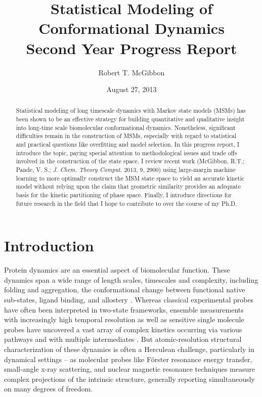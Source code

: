 \documentclass[twocolumn,floatfix,nofootinbib,aps]{revtex4-1}
\begin{document}
\title{Statistical Modeling of Conformational Dynamics \\ {\normalsize Second Year Progress Report}}
\author{Robert T. McGibbon} 
\date{August 27, 2013}

\begin{abstract}
Statistical modeling of long timescale dynamics with Markov state models (MSMs) has been shown to be an effective strategy for building quantitative and qualitative insight into long-time scale biomolecular conformational dynamics. Nonetheless, significant difficulties remain in the construction of MSMs, especially with regard to statistical and practical questions like overfitting and model selection. In this progress report, I introduce the topic, paying special attention to methodological issues and trade offs involved in the construction of the state space. I review recent work (McGibbon, R.T.; Pande, V. S.; \emph{J. Chem. Theory Comput.} 2013, 9, 2900) using large-margin machine learning to more optimally construct the MSM state space to yield an accurate kinetic model without relying upon the claim that geometric similarity provides an adequate basis for the kinetic partitioning of phase space. Finally, I introduce directions for future research in the field that I hope to contribute to over the course of my Ph.D.
\end{abstract}

\maketitle

\section{Introduction}
Protein dynamics are an essential aspect of biomolecular function. These dynamics span a wide range of length scales, timescales and complexity, including folding and aggregation, the conformational change between functional native sub-states, ligand binding, and allostery \cite{Dobson2003Protein, Kim2008Real, Austin1975Dynamics, Bahar2007Intrinsic}. Whereas classical experimental probes have often been interpreted in two-state frameworks, ensemble measurements with increasingly high temporal resolution as well as sensitive single molecule probes have uncovered a vast array of complex kinetics occurring via various pathways and with multiple intermediates \cite{Cosa2006Evidence, Zhang2011Direct}. But atomic-resolution structural characterization of these dynamics is often a Herculean challenge, particularly in dynamical settings -- as molecular probes like F\"{o}rster resonance energy transfer, small-angle x-ray scattering, and nuclear magnetic resonance techniques measure complex projections of the intrinsic structure, generally reporting simultaneously on many degrees of freedom\cite{Mertens2010Structural, Tzeng2011Protein}.
\end{document}
